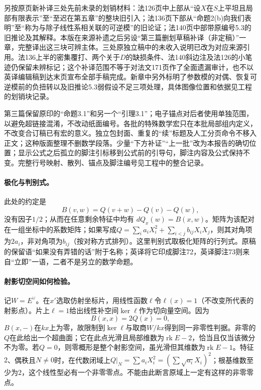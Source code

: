 另按原页新补译三处先前未录的划销材料：法126页中上部从“设$X$在$S$上平坦且局部有限表示”至“至迟在第五章”的整块旧引入；法136页下部从“命题2(b)向我们表明”至“称为与除子线性系相关联的可逆模”的旧论证；法140页中部带原编号5.3的旧推论及其解释。本版在来源补遗之后另设“第三篇删划草稿补译（非定稿）”一章，完整译出这三块可辨主体。三处原独立稿中的未收入说明已改为对应来源引用。法136上半的密集覆打、两个关于$D$的缺损条件、法140斜边注及法126的小笔迹仍保留未辨标记；这个补译范围不等于对法文171页作了全面遗漏审计，也不以英译编辑稿到达末页宣布全部手稿完成。新章中另外标明了参数模的对偶、恢复可逆模前的负扭转以及旧推论5.3弱假设不足三项处理，具体图像位置和依据见工程的划销块记录。

第三篇保留原印的“命题3.1”和另一个“引理3.1”；电子锚点对后者使用单独范围，以避免超链接混淆，不改动纸面编号。各批的特殊数学宏只在本批局部组内定义，不改变合订稿已有宏的意义。独立包封面、重复的“续”标题及人工分页命令不移入正文；这种版面整理不删数学段落。少量“下方补证”“上一批”改为本报告的确切位置；显示公式之后孤立的脚注引标移到公式前的引导句，脚注内容及公式保持不变。完整行号映射、散列、锚点及脚注编号见工程中的整合记录。

\begingroup
\def\OO{\mathcal O}
\def\Sym{\operatorname{Sym}}
\def\rk{\operatorname{rk}}
\hypertarget{audit:L18-069}{}

\paragraph{极化与判别式。}
此处的约定是
\[
B(v,w)=Q(v+w)-Q(v)-Q(w),
\]
没有因子$1/2$；从而在任意剩余特征中均有
$dQ_x(w)=B(x,w)$。矩阵为该配对在一组坐标中的系数矩阵；如果写成$Q=\sum_i a_i X_i^2+\sum_{i<j} b_{ij}X_iX_j$，则其对角项为$2a_i$，非对角项为$b_{ij}$（按对称方式排列）。这里判别式取极化矩阵的行列式。原稿的保留语“如果没有弄错的话”附于名称；英译将它印成脚注72，英译脚注73则来自“立即”一语，二者不是另立的数学命题。

\paragraph{射影切空间如何检验。}
记$W=E^\vee$。在$x'$选取仿射坐标片，用线性函数$\ell$令$\ell(x)=1$（不改变所代表的射影点）。片上$\ell=1$给出线性补空间$\ker\ell$作为切向量空间。因为
\[
B(x,x)=2Q(x)=0,
\]
$B(x,-)$在$kx$上为零，故限制到$\ker\ell$与取商$W/kx$得到同一非零性判据。非零的$Q$在此给出一个超曲面；它在此点光滑且局部维数为$\rk E-2$，恰当且仅当该微分不为零。若$Q=0$，则零概形是整个射影空间，虽光滑但其维数为$\rk E-1$。特征$2$、偶秩且$N\ne0$时，在代数闭域上$Q|_N=\sum a_i X_i^2=(\sum\sqrt{a_i}X_i)^2$；根基维数至少为$2$，这个线性型必有一个非零零点。不能由此断言原域上一定有这样的非零零点。

